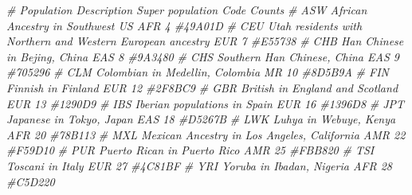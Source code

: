 \documentclass[
]{book}
\newenvironment{Shaded}{\begin{snugshade}}{\end{snugshade}}
\newcommand{\CommentTok}[1]{\textcolor[rgb]{0.56,0.35,0.01}{\textit{#1}}}
\begin{document}
\begin{Shaded}
\begin{Highlighting}[]
\CommentTok{\# Population    Description Super population    Code    Counts}
\CommentTok{\# ASW   African Ancestry in Southwest US                              AFR   4     \#49A01D}
\CommentTok{\# CEU   Utah residents with Northern and Western European ancestry  EUR 7     \#E55738}
\CommentTok{\# CHB   Han Chinese in Bejing, China                                  EAS   8     \#9A3480}
\CommentTok{\# CHS   Southern Han Chinese, China                                 EAS 9     \#705296}
\CommentTok{\# CLM   Colombian in Medellin, Colombia                             MR  10  \#8D5B9A}
\CommentTok{\# FIN   Finnish in Finland                                          EUR 12  \#2F8BC9}
\CommentTok{\# GBR   British in England and Scotland                             EUR 13  \#1290D9}
\CommentTok{\# IBS   Iberian populations in Spain                                  EUR   16  \#1396D8}
\CommentTok{\# JPT   Japanese in Tokyo, Japan                                      EAS   18  \#D5267B}
\CommentTok{\# LWK   Luhya in Webuye, Kenya                                      AFR 20  \#78B113}
\CommentTok{\# MXL   Mexican Ancestry in Los Angeles, California                 AMR 22  \#F59D10}
\CommentTok{\# PUR   Puerto Rican in Puerto Rico                                 AMR 25  \#FBB820}
\CommentTok{\# TSI   Toscani in Italy                                              EUR   27  \#4C81BF}
\CommentTok{\# YRI   Yoruba in Ibadan, Nigeria                                     AFR   28  \#C5D220}


\end{Highlighting}
\end{Shaded}
\end{document}
